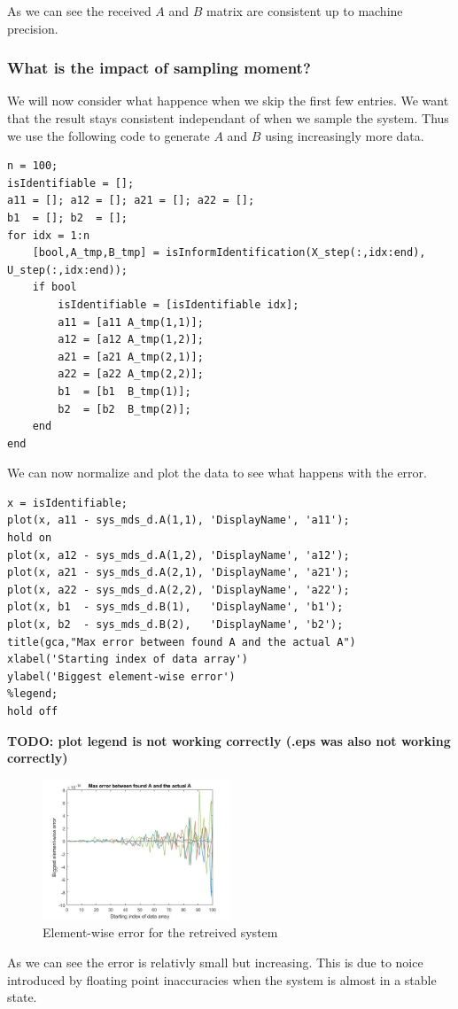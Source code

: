 As we can see the received $A$ and $B$ matrix are consistent up to machine precision.

\subsubsection{What is the impact of sampling moment?}
We will now consider what happence when we skip the first few entries. We want that the result stays consistent independant of when we sample the system. Thus we use the following code to generate $A$ and $B$ using increasingly more data. 

\begin{lstlisting}
n = 100;
isIdentifiable = [];
a11 = []; a12 = []; a21 = []; a22 = [];
b1  = []; b2  = [];
for idx = 1:n
    [bool,A_tmp,B_tmp] = isInformIdentification(X_step(:,idx:end), U_step(:,idx:end));
    if bool
        isIdentifiable = [isIdentifiable idx];
        a11 = [a11 A_tmp(1,1)];
        a12 = [a12 A_tmp(1,2)];
        a21 = [a21 A_tmp(2,1)];
        a22 = [a22 A_tmp(2,2)];
        b1  = [b1  B_tmp(1)];
        b2  = [b2  B_tmp(2)];
    end
end
\end{lstlisting}

We can now normalize and plot the data to see what happens with the error.

\begin{lstlisting}
x = isIdentifiable;
plot(x, a11 - sys_mds_d.A(1,1), 'DisplayName', 'a11');
hold on
plot(x, a12 - sys_mds_d.A(1,2), 'DisplayName', 'a12');
plot(x, a21 - sys_mds_d.A(2,1), 'DisplayName', 'a21');
plot(x, a22 - sys_mds_d.A(2,2), 'DisplayName', 'a22');
plot(x, b1  - sys_mds_d.B(1),   'DisplayName', 'b1');
plot(x, b2  - sys_mds_d.B(2),   'DisplayName', 'b2');
title(gca,"Max error between found A and the actual A")
xlabel('Starting index of data array')
ylabel('Biggest element-wise error')
%legend;
hold off
\end{lstlisting}

\textbf{TODO: plot legend is not working correctly (.eps was also not working correctly)}

\begin{figure}[H]
	\centering
	\includegraphics[width=0.5\textwidth]{Latex/image/ex-msd/startingPos.jpg}
	\caption{Element-wise error for the retreived system}
\end{figure}

As we can see the error is relativly small but increasing. This is due to noice introduced by floating point inaccuracies when the system is almost in a stable state.




















